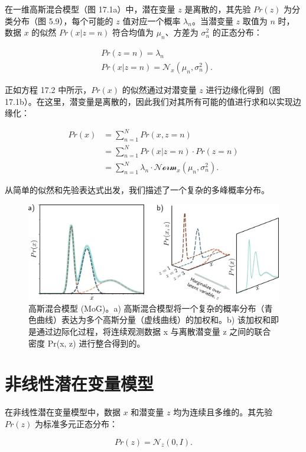 在一维高斯混合模型（图 17.1a）中，潜在变量 \(z\) 是离散的，其先验 \(Pr(z)\) 为分类分布（图 5.9），每个可能的 \(z\) 值对应一个概率 \(\lambda_n\)。当潜变量 \(z\) 取值为 \(n\) 时，数据 \(x\) 的似然 \(Pr(x|z = n)\) 符合均值为 \(\mu_n\)、方差为 \(\sigma^2_n\) 的正态分布：


\begin{align}
&Pr(z = n) = \lambda_n \\
&Pr(x|z = n) = \mathcal{N}_{x}(\mu_n, \sigma^2_n). 
\end{align} 


正如方程 17.2 中所示，\(Pr(x)\) 的似然通过对潜变量 \(z\) 进行边缘化得到（图 17.1b）。在这里，潜变量是离散的，因此我们对其所有可能的值进行求和以实现边缘化：


\begin{align}
Pr(x) &= \sum_{n=1}^{N} Pr(x, z = n) \\
&= \sum_{n=1}^{N} Pr(x|z = n) \cdot Pr(z = n) \\
&= \sum_{n=1}^{N} \lambda_n \cdot \mathcal{Norm}_x(\mu_n, \sigma^2_n). 
\end{align} 


从简单的似然和先验表达式出发，我们描述了一个复杂的多峰概率分布。

\begin{figure}[ht!]
\centering
\includegraphics[width=0.7\linewidth]{png/chapter17/VAEMixGauss.png}
\caption{高斯混合模型 (MoG)。a) 高斯混合模型将一个复杂的概率分布（青色曲线）表达为多个高斯分量（虚线曲线）的加权和。b) 该加权和即是通过边际化过程，将连续观测数据 x 与离散潜变量 z 之间的联合密度 Pr(x, z) 进行整合得到的。}
\end{figure}


\section{非线性潜在变量模型}

在非线性潜在变量模型中，数据 \(x\) 和潜变量 \(z\) 均为连续且多维的。其先验 \(Pr(z)\) 为标准多元正态分布：

\begin{equation}
Pr(z) = \mathcal{N}_z(0, I). 
\end{equation}

